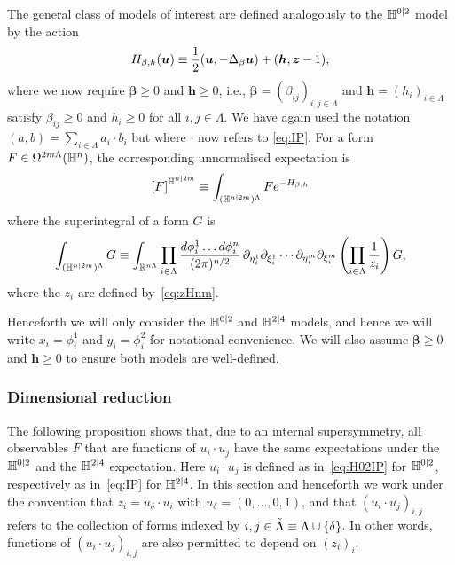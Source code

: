 \documentclass[11pt]{amsart}
\numberwithin{equation}{section}
\numberwithin{theorem}{section}
\newcommand{\ob}[1]{\left(#1\right )} %
\newcommand{\cb}[1]{\left[#1\right ]} %
\newcommand{\V}[1]{\boldsymbol{#1}}
\begin{document}
The general class of models of
interest are defined analogously to the $\mathbb{H}^{0|2}$ model by the
action
\begin{equation}
  \label{eq:H}
  H_{\beta,h}(\V{u}) \bydef \frac{1}{2}(\V{u},-\Delta_{\beta}\V{u}) + (\V{h},\V{z}-1),
\end{equation}
where we now require $\V{\beta} \geq 0$ and $\V{h}\geq
0$, i.e.,
$\V{\beta}=(\beta_{ij})_{i,j\in\Lambda}$ and
$\V{h}=(h_i)_{i\in\Lambda}$ satisfy $\beta_{ij} \geq 0$ and $h_i\geq
0$ for all $i,j\in\Lambda$. We have again used the notation $(a,b) =
\sum_{i\in\Lambda}a_{i}\cdot b_{i}$ but where
  $\cdot$ now refers to \eqref{eq:IP}.  For a form $F \in
\Omega^{2m\Lambda}(\mathbb{H}^{n})$, the corresponding unnormalised
expectation is
\begin{equation}
  \label{eq:exp}
  \cb{F}^{\HH^{n|2m}} \bydef \int_{(\HH^{n|2m})^\Lambda} F e^{-H_{\beta,h}}
\end{equation}
where the superintegral of a form $G$ is
\begin{equation}
  \int_{(\HH^{n|2m})^{\Lambda}}G \bydef 
  \int_{\R^{n\Lambda}} \prod_{i\in\Lambda}\frac{d\phi^1_{i} \dots
  d\phi^n_{i}}{(2\pi)^{n/2}} \, \partial_{\eta^1_{i}}\partial_{\xi^1_{i}}
  \cdots \partial_{\eta^m_{i}}\partial_{\xi^m_{i}}
  \ob{\prod_{i\in\Lambda}\frac{1}{z_{i}}} G,
\end{equation}
where the $z_{i}$ are defined by~\eqref{eq:zHnm}.

Henceforth we will only consider the $\mathbb{H}^{0|2}$ and $\mathbb{H}^{2|4}$
models, and hence we will write $x_{i}=\phi_{i}^{1}$ and
$y_{i}=\phi^{2}_{i}$ for notational convenience.  We will also assume
$\V{\beta}\geq 0$ and $\V{h}\geq 0$ to ensure both models are
well-defined. 


\subsubsection*{Dimensional reduction}

The following proposition shows that, due to an internal
supersymmetry, all observables $F$ that are functions of
$u_i\cdot u_j$ have the same expectations under the $\mathbb{H}^{0|2}$ and
the $\mathbb{H}^{2|4}$ expectation. Here $u_i\cdot u_j$ is defined as
in~\eqref{eq:H02IP} for $\mathbb{H}^{0|2}$, respectively as in~\eqref{eq:IP} for $\mathbb{H}^{2|4}$.
In this section and henceforth we work under the convention that 
$z_i = u_\delta \cdot u_i$ with $u_\delta = (0,\dots, 0,1)$, and that
$(u_i\cdot u_j)_{i,j}$ refers to the collection of forms indexed by
$i,j \in \tilde \Lambda \equiv \Lambda \cup \{\delta\}$.  In other
words, functions of $(u_i\cdot u_j)_{i,j}$ are also permitted to
depend on $(z_i)_{i}$.
\end{document}
